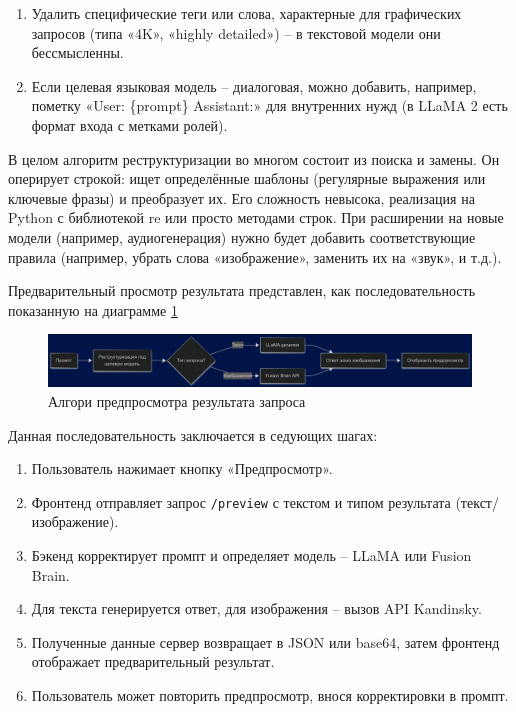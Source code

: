\begin{enumerate}[label=\arabic*.]
\begin{enumerate}[label=2.\arabic*.]
        \item Удалить специфические теги или слова, характерные для графических запросов (типа «4K», «highly detailed») – в текстовой модели они бессмысленны.
        \item Если целевая языковая модель – диалоговая, можно добавить, например, пометку «User: \{prompt\} Assistant:» для внутренних нужд (в LLaMA 2 есть формат входа с метками ролей).
    \end{enumerate}
\end{enumerate}
В целом алгоритм реструктуризации во многом состоит из поиска и замены. Он оперирует строкой: ищет определённые шаблоны (регулярные выражения или ключевые фразы) и преобразует их. Его сложность невысока, реализация на Python с библиотекой re или просто методами строк. При расширении на новые модели (например, аудиогенерация) нужно будет добавить соответствующие правила (например, убрать слова «изображение», заменить их на «звук», и т.д.).

Предварительный просмотр результата представлен, как последовательность показанную на диаграмме \ref{algo-3}
\begin{figure}[htbp]
    \centering
    \includegraphics[width=1\textwidth]{picture/diploma-inter-algo-3.png}
    \caption{Алгори предпросмотра  результата запроса}
    \label{algo-3}
\end{figure}


Данная последовательность заключается в седующих шагах:
\begin{enumerate}[label=\arabic*)]
    \item Пользователь нажимает кнопку «Предпросмотр».
    \item Фронтенд отправляет запрос \texttt{/preview} с текстом и типом результата (текст/изображение).
    \item Бэкенд корректирует промпт и определяет модель – LLaMA или Fusion Brain.
    \item Для текста генерируется ответ, для изображения – вызов API Kandinsky.
    \item Полученные данные сервер возвращает в JSON или base64, затем фронтенд отображает предварительный результат.
    \item Пользователь может повторить предпросмотр, внося корректировки в промпт.
\end{enumerate}

